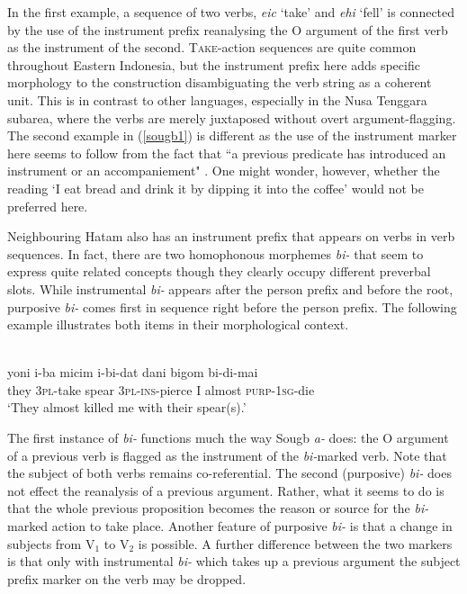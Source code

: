 In the first example, a sequence of two verbs, \textit{eic} `take' and \textit{ehi} `fell' is connected by the use of the instrument prefix reanalysing the O argument of the first verb as the instrument of the second. \textsc{Take}-action sequences are quite common throughout Eastern Indonesia, but the instrument prefix here adds specific morphology to the construction disambiguating the verb string as a coherent unit. This is in contrast to other languages, especially in the Nusa Tenggara subarea, where the verbs are merely juxtaposed without overt argument-flagging. The second example in (\ref{sougb1}) is different as the use of the instrument marker here seems to follow from the fact that ``a previous predicate has introduced an instrument or an accompaniement" \citep[205]{reesink2002grammar}. One might wonder, however, whether the reading `I eat bread and drink it by dipping it into the coffee' would not be preferred here.

Neighbouring Hatam also has an instrument prefix that appears on verbs in verb sequences. In fact, there are two homophonous morphemes \textit{bi-} that seem to express quite related concepts though they clearly occupy different preverbal slots. While instrumental \textit{bi-} appears after the person prefix and before the root, purposive \textit{bi-} comes first in sequence right before the person prefix. The following example illustrates both items in their morphological context.

\ea 
{}\\
\gll yoni i-ba micim i-bi-dat dani bigom bi-di-mai \\
they \textsc{3}\textsc{pl}-take spear \textsc{3}\textsc{pl}-\textsc{ins}-pierce I almost \textsc{purp}-\textsc{1}\textsc{sg}-die \\
\glft `They almost killed me with their spear(s).' 
\z

The first instance of \textit{bi-} functions much the way Sougb \textit{a-} does: the O argument of a previous verb is flagged as the instrument of the \textit{bi-}marked verb. Note that the subject of both verbs remains co-referential. The second (purposive) \textit{bi-} does not effect the reanalysis of a previous argument. Rather, what it seems to do is that the whole previous proposition becomes the reason or source for the \textit{bi-}marked action to take place. Another feature of purposive \textit{bi-} is that a change in subjects from V$_1$ to V$_2$ is possible. A further difference between the two markers is that only with instrumental \textit{bi-} which takes up a previous argument the subject prefix marker on the verb may be dropped.

